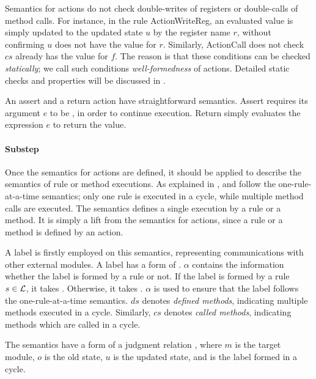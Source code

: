 Semantics for actions do not check double-writes of registers or
double-calls of method calls. For instance, in the rule
ActionWriteReg, an evaluated value is simply updated to the updated
state $u$ by the register name $r$, without confirming $u$ does not
have the value for $r$. Similarly, ActionCall does not check $cs$
already has the value for $f$. The reason is that these conditions can
be checked \emph{statically}; we call such conditions
\emph{well-formedness} of actions. Detailed static checks and
properties will be discussed in .

An assert and a return action have straightforward semantics. Assert
requires its argument $e$ to be \btrue{}, in order to continue
execution. Return simply evaluates the expression $e$ to return the
value.

\paragraph{Substep}
Once the semantics for actions are defined, it should be applied to
describe the semantics of rule or method executions. As explained in
, \Bluespec{} and \Kami{} follow the one-rule-at-a-time
semantics; only one rule is executed in a cycle, while multiple method
calls are executed. The \Substep{} semantics defines a single
execution by a rule or a method. It is simply a lift from the
semantics for actions, since a rule or a method is defined by an
action.

A label is firstly employed on this semantics, representing
communications with other external modules. A label has a form of
. $\alpha$ contains the information whether the
label is formed by a rule or not. If the label is formed by a rule $s
\in \mathcal{L}$, it takes . Otherwise, it takes
\alphameth{}. $\alpha$ is used to ensure that the label follows the
one-rule-at-a-time semantics. $ds$ denotes \emph{defined methods},
indicating multiple methods executed in a cycle. Similarly, $cs$
denotes \emph{called methods}, indicating methods which are called in
a cycle.

The \Substep{} semantics have a form of a judgment relation
, where $m$ is the target module,
$o$ is the old state, $u$ is the updated state, and
 is the label formed in a cycle.

